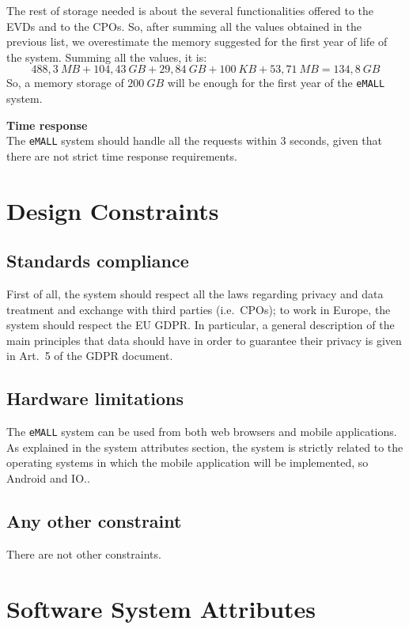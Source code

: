 The rest of storage needed is about the several functionalities offered to the EVDs and to the CPOs.
So, after summing all the values obtained in the previous list, we overestimate the memory suggested for the first year
of life of the system.
Summing all the values, it is:
\[
    488,3\ MB + 104,43\ GB + 29,84\ GB + 100\ KB + 53,71\ MB = 134,8\ GB
\]
So, a memory storage of $200\ GB$ will be enough for the first year of the \verb|eMALL| system.

\textbf{Time response} \\
The \verb|eMALL| system should handle all the requests within 3 seconds, given that there are not strict time response requirements.


\section{Design Constraints}
\label{sec:design_constraints}%

\subsection{Standards compliance}
\label{subsec:standards_compliance}%
First of all, the system should respect all the laws regarding privacy and data treatment and exchange with third parties (i.e.\ CPOs);
to work in Europe, the system should respect the EU GDPR\@.
In particular, a general description of the main principles that data should have in order to guarantee their privacy
is given in Art.\ 5 of the GDPR document.

\subsection{Hardware limitations}
\label{subsec:hardware_limitations}%
The \verb|eMALL| system can be used from both web browsers and mobile applications.
As explained in the system attributes section, the system is strictly related to the operating systems
in which the mobile application will be implemented, so Android and IO\@..

\subsection{Any other constraint}
\label{subsec:any_other_constraint}%
There are not other constraints.


\section{Software System Attributes}
\label{sec:software_system_attributes}%

